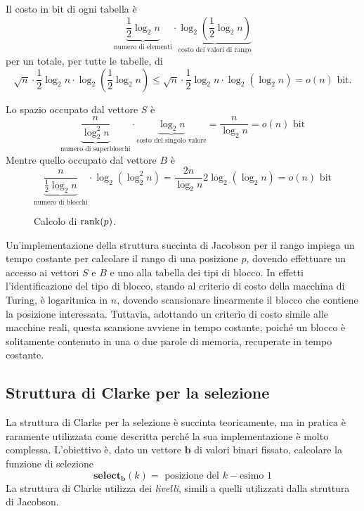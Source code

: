 Il costo in bit di ogni tabella è
\begin{equation*}
	\underbrace{\frac{1}{2}\log_2 n}_\text{numero di elementi}\cdot \underbrace{\log_2\left(\frac{1}{2}\log_2 n\right)}_\text{costo dei valori di rango}
\end{equation*}
per un totale, per tutte le tabelle, di
\begin{equation*}
	\sqrt n\cdot\frac{1}{2}\log_2 n\cdot \log_2\left(\frac{1}{2}\log_2 n\right)
	\leq \sqrt n\cdot \frac{1}{2}\log_2 n\cdot \log_2(\log_2 n) = o(n) \text{ bit.}
\end{equation*}

Lo spazio occupato dal vettore $S$ è
\begin{equation*}
	\underbrace{\frac{n}{\log_2^2 n}}_\text{numero di superblocchi}\cdot\underbrace{\log_2 n}_\text{costo del singolo valore} = \frac{n}{\log_2 n} = o(n) \text{ bit}
\end{equation*}
Mentre quello occupato dal vettore $B$ è
\begin{equation*}
	\underbrace{\frac{n}{\frac{1}{2}\log_2 n}}_\text{numero di blocchi} \cdot\log_2(\log_2^2 n) =
	\frac{2n}{\log_2 n} 2 \log_2(\log_2 n) = o(n) \text{ bit}
\end{equation*}

\begin{figure}
	\centering
	
	\caption{Calcolo di $\mathrm{rank}(p)$.}
	\label{fig:example_rank_p}
\end{figure}

Un'implementazione della struttura succinta di Jacobson per il rango impiega un tempo costante per calcolare il rango di una posizione $p$, dovendo effettuare un accesso ai vettori $S$ e $B$ e uno alla tabella dei tipi di blocco. In effetti l'identificazione del tipo di blocco, stando al criterio di costo della macchina di Turing, è logaritmica in $n$, dovendo scansionare linearmente il blocco che contiene la posizione interessata. Tuttavia, adottando un criterio di costo simile alle macchine reali, questa scansione avviene in tempo costante, poiché un blocco è solitamente contenuto in una o due parole di memoria, recuperate in tempo costante.


\subsection{Struttura di Clarke per la selezione}
La struttura di Clarke per la selezione è succinta teoricamente, ma in pratica
è raramente utilizzata come descritta perché la sua implementazione è molto
complessa.
L'obiettivo è, dato un vettore $\mathbf{b}$ di valori binari fissato, calcolare
la funzione di selezione
$$
	\mathbf{select_b}(k) = \text{ posizione del } k-\text{esimo } 1
$$
La struttura di Clarke utilizza dei \textit{livelli}, simili a quelli utilizzati
dalla struttura di Jacobson.

